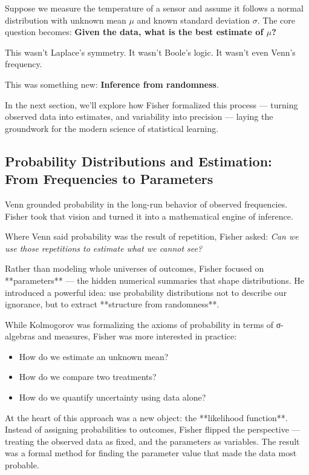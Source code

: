 Suppose we measure the temperature of a sensor and assume it follows a normal distribution with unknown mean \( \mu \) and known standard deviation \( \sigma \).  
The core question becomes:  
\textbf{Given the data, what is the best estimate of \( \mu \)?}

This wasn’t Laplace’s symmetry. It wasn’t Boole’s logic. It wasn’t even Venn’s frequency.

This was something new: \textbf{Inference from randomness}.

\medskip

In the next section, we’ll explore how Fisher formalized this process — turning observed data into estimates, and variability into precision — laying the groundwork for the modern science of statistical learning.


\subsection{Probability Distributions and Estimation: From Frequencies to Parameters}

Venn grounded probability in the long-run behavior of observed frequencies. Fisher took that vision and turned it into a mathematical engine of inference.

Where Venn said probability was the result of repetition, Fisher asked:  
\textit{Can we use those repetitions to estimate what we cannot see?}

Rather than modeling whole universes of outcomes, Fisher focused on **parameters** — the hidden numerical summaries that shape distributions. He introduced a powerful idea: use probability distributions not to describe our ignorance, but to extract **structure from randomness**.

\medskip

While Kolmogorov was formalizing the axioms of probability in terms of σ-algebras and measures, Fisher was more interested in practice: 
\begin{itemize}
    \item How do we estimate an unknown mean?
    \item How do we compare two treatments?
    \item How do we quantify uncertainty using data alone?
\end{itemize}

At the heart of this approach was a new object: the **likelihood function**. Instead of assigning probabilities to outcomes, Fisher flipped the perspective — treating the observed data as fixed, and the parameters as variables. The result was a formal method for finding the parameter value that made the data most probable.

